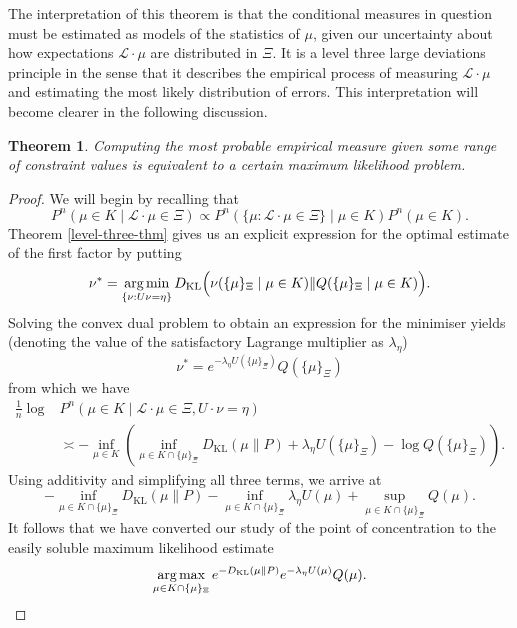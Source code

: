 \documentclass[11pt]{amsart}
\numberwithin{equation}{section}
\newtheorem{theorem}{Theorem}[section]
\theoremstyle{remark}
\theoremstyle{remark}
\newcommand{\lag}{\mathcal{L}}
\DeclareMathOperator*{\argmax}{\text{arg\,max}}
\DeclareMathOperator*{\argmin}{\text{arg\,min}}
\begin{document}
The interpretation of this theorem is that the conditional measures in question must be estimated as models of the statistics of $\mu$, given our uncertainty about how expectations $\lag\cdot \mu$ are distributed in $\Xi$. It is a level three large deviations principle in the sense that it describes the empirical process of measuring $\lag\cdot\mu$ and estimating the most likely distribution of errors. This interpretation will become clearer in the following discussion.

\begin{theorem}\label{max-likelihood-thm}
    Computing the most probable empirical measure given some range of constraint values is equivalent to a certain maximum likelihood problem.
\end{theorem}
\begin{proof}
    We will begin by recalling that
    \[
        P^n(\mu \in K \mid \lag\cdot\mu \in \Xi) \propto P^n(\{\mu : \lag\cdot\mu \in \Xi\} \mid \mu \in K) P^n(\mu \in K).
    \]
    Theorem \ref{level-three-thm} gives us an explicit expression for the optimal estimate of the first factor by putting
    \[
        \nu^* = \argmin_{\{\nu : U\nu = \eta\}} D_{\mathrm{KL}}\Big(\nu(\{\mu\}_\Xi \mid \mu \in K) \| Q(\{\mu\}_\Xi \mid \mu \in K)\Big).
    \]
    Solving the convex dual problem to obtain an expression for the minimiser yields (denoting the value of the satisfactory Lagrange multiplier as $\lambda_\eta$)
    \[
        \nu^* = e^{-\lambda_\eta U(\{\mu\}_\Xi)}Q(\{\mu\}_\Xi)
    \]
    from which we have 
    \begin{align*}
        \frac{1}{n}\log &P^n(\mu \in K \mid \lag \cdot \mu \in \Xi, U\cdot \nu = \eta) \\ &\asymp -\inf_{\mu \in K}\left(\inf_{\mu \in K \cap \{\mu\}_\Xi}D_{\mathrm{KL}}(\mu \| P) + %
        \lambda_\eta U(\{\mu\}_\Xi) - \log Q(\{\mu\}_\Xi) \right).
    \end{align*}
    Using additivity and simplifying all three terms, we arrive at
    \[
        -\inf_{\mu \in K \cap \{\mu\}_\Xi} D_{\mathrm{KL}}(\mu \| P) -\inf_{\mu \in K \cap \{\mu\}_\Xi}\lambda_\eta U(\mu) + \sup_{\mu \in K \cap \{\mu\}_\Xi} Q(\mu).
    \]
    It follows that we have converted our study of the point of concentration to the easily soluble maximum likelihood estimate
    \begin{equation}\label{max-likelihood-eq}
        \argmax_{\mu \in K \cap \{\mu\}_\Xi} e^{- D_{\mathrm{KL}}(\mu \| P)} e^{-\lambda_\eta U(\mu)}Q(\mu).
    \end{equation}
\end{proof}
\end{document}
